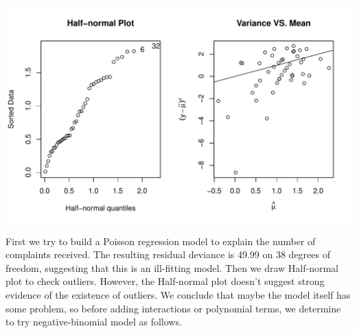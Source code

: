 \documentclass[12pt,oneside,a4paper]{article}\usepackage[]{graphicx}\usepackage[]{xcolor}
\newenvironment{knitrout}{}{} %
\begin{document}
\begin{knitrout}
{\centering \includegraphics[width=1\linewidth]{figure/p7-1} 

}



\end{knitrout}

First we try to build a Poisson regression model to explain the number of complaints received. The resulting residual deviance is 49.99 on 38 degrees of freedom, suggesting that this is an ill-fitting model. Then we draw Half-normal plot to check outliers. However, the Half-normal plot doesn't suggest strong evidence of the existence of outliers. We conclude that maybe the model itself has some problem, so before adding interactions or polynomial terms, we determine to try negative-binomial model as follows.
\end{document}
